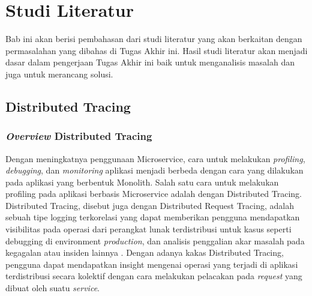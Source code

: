 \chapter{Studi Literatur}

Bab ini akan berisi pembahasan dari studi literatur yang akan berkaitan dengan permasalahan yang dibahas di Tugas Akhir ini. Hasil studi literatur akan menjadi dasar dalam pengerjaan Tugas Akhir ini baik untuk menganalisis masalah dan juga untuk merancang solusi.

\section{Distributed Tracing}
\label{bab2-dtracing}

\subsection{\textit{Overview} Distributed Tracing}
Dengan meningkatnya penggunaan Microservice, cara untuk melakukan \textit{profiling}, \textit{debugging}, dan \textit{monitoring} aplikasi menjadi berbeda dengan cara yang dilakukan pada aplikasi yang berbentuk Monolith.
Salah satu cara untuk melakukan profiling pada aplikasi berbasis Microservice adalah dengan Distributed Tracing.
Distributed Tracing, disebut juga dengan Distributed Request Tracing, adalah sebuah tipe logging terkorelasi yang dapat memberikan pengguna mendapatkan visibilitas pada operasi dari perangkat lunak terdistribusi untuk kasus seperti debugging di environment \textit{production}, dan analisis penggalian akar masalah pada kegagalan atau insiden lainnya \citep{parker2020distributed}.
Dengan adanya kakas Distributed Tracing, pengguna dapat mendapatkan insight mengenai operasi yang terjadi di aplikasi terdistribusi secara kolektif dengan cara melakukan pelacakan pada \textit{request} yang dibuat oleh suatu \textit{service}.

